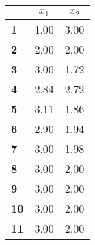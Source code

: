 \begin{small}\begin{tabular}{|l|c|c|}
\hline
&\textbf{$x_1$}&\textbf{$x_2$}\\\hline
\textbf{1}&1.00&3.00\\\hline
\textbf{2}&2.00&2.00\\\hline
\textbf{3}&3.00&1.72\\\hline
\textbf{4}&2.84&2.72\\\hline
\textbf{5}&3.11&1.86\\\hline
\textbf{6}&2.90&1.94\\\hline
\textbf{7}&3.00&1.98\\\hline
\textbf{8}&3.00&2.00\\\hline
\textbf{9}&3.00&2.00\\\hline
\textbf{10}&3.00&2.00\\\hline
\textbf{11}&3.00&2.00\\\hline
\end{tabular}
\end{small}